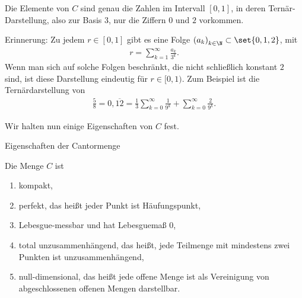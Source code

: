 \begin{bemerkung}
  Die Elemente von $C$ sind genau die Zahlen im Intervall $[0, 1]$, in deren Ternär-Darstellung, also zur Basis $3$, nur die Ziffern $0$ und $2$ vorkommen. 

Erinnerung: Zu jedem $r \in [0, 1]$ gibt es eine Folge $\left(a_k\right)_{k \in \N} \subset \set {0, 1, 2}$, mit 
\begin{align*}
  r = \sum_{k = 1}^ \infty \frac {a_k}{3^k}.
\end{align*}
Wenn man sich auf solche Folgen beschränkt, die nicht schließlich konstant $2$ sind, ist diese Darstellung eindeutig für $r \in [0,1)$. Zum Beispiel ist die Ternärdarstellung von 
\begin{align*}
  \frac 5 8 = 0,\overline{12} = \frac 1 3 \sum_{k = 0}^\infty \frac 1 {9^k} + \sum_{k = 0}^\infty  \frac 2 {9^k}.
\end{align*}
\end{bemerkung}
Wir halten nun einige Eigenschaften von $C$ fest. 
\begin{lemma} Eigenschaften der Cantormenge
  
Die Menge $C$ ist 
\renewcommand{\labelenumi}{(\alph{enumi})}
\begin{enumerate}
\item kompakt, 
\item perfekt, das heißt jeder Punkt ist Häufungspunkt, 
\item Lebesgue-messbar und hat Lebesguemaß $0$, 
\item total unzusammenhängend, das heißt, jede Teilmenge mit mindestens zwei Punkten ist unzusammenhängend, 
\item null-dimensional, das heißt jede offene Menge ist als Vereinigung von abgeschlossenen offenen Mengen darstellbar.  
\end{enumerate}
\end{lemma}
